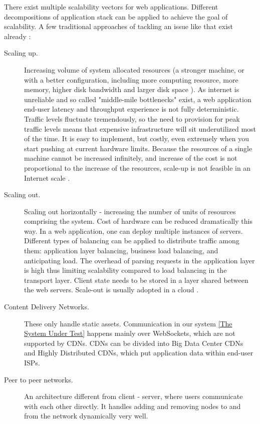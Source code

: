 \documentclass{uvamscse}
\begin{document}
There exist multiple scalability vectors for web applications. Different decompositions of application stack can be applied to achieve the goal of scalability. A few traditional approaches of tackling an issue like that exist already \cite{Akamai}:
\begin{description}
  \item[Scaling up.]
  Increasing volume of system allocated resources (a stronger machine, or with a better configuration, including more computing resource, more memory, higher disk bandwidth and larger disk space \cite{WeiTek}). As internet is unreliable and so called "middle-mile bottlenecks" exist, a web application end-user latency and throughput experience is not fully deterministic. Traffic levels fluctuate tremendously, so the need to provision for peak traffic levels means that expensive infrastructure will sit underutilized most of the time. It is easy to implement, but costly, even extremely when you start pushing at current hardware limits.\cite{Qvef} Because the resources of a single machine cannot be increased infinitely, and increase of the cost is not proportional to the increase of the resources, scale-up is not feasible in an Internet scale \cite{WeiTek}.
  \item[Scaling out.]
  Scaling out horizontally - increasing the number of units of resources comprising the system. Cost of hardware can be reduced dramatically this way. In a web application, one can deploy multiple instances of servers. Different types of balancing can be applied to distribute traffic among them: application layer balancing, business load balancing, and anticipating load. The overhead of parsing requests in the application layer is high thus limiting scalability compared to load balancing in the transport layer. Client state needs to be stored in a layer shared between the web servers.\cite{Qvef}  Scale-out is usually adopted in a cloud \cite{WeiTek}.
  \item[Content Delivery Networks.]
  These only handle static assets. Communication in our system \ref{The System Under Test} happens mainly over WebSockets, which are not supported by CDNs. CDNs can be divided into Big Data Center CDNs and Highly Distributed CDNs, which put application data within end-user ISPs.\cite{Akamai}
  \item[Peer to peer networks.]
  An architecture different from client - server, where users communicate with each other directly. It handles adding and removing nodes to and from the network dynamically very well.
\end{description}
\end{document}
